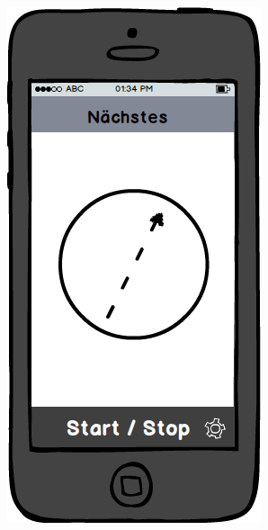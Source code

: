 \begin{figure}[ht]
\centering
\begin{minipage}[b]{.5\textwidth}
  \centering
  \includegraphics[width=.8\linewidth]{img/navigation-mockup.png}
  \label{img:navigation-mockup}
\end{minipage}%
\begin{minipage}[b]{.5\textwidth}
  \centering

\end{minipage}
\end{figure}
